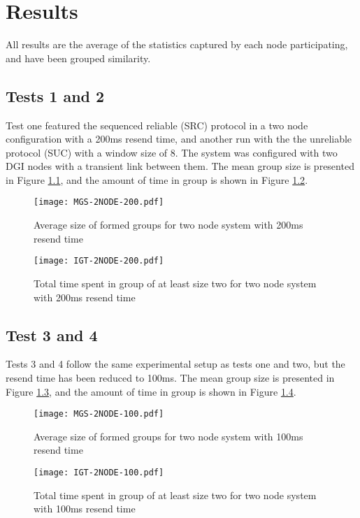 \chapter{Results}

All results are the average of the statistics captured by each node participating, and have been grouped similarity.

\section{Tests 1 and 2}
Test one featured the sequenced reliable (SRC) protocol in a two node configuration with a 200ms resend time, and another run with the
the unreliable protocol (SUC) with a window size of 8. The system was configured with two DGI nodes with a transient link between them.
The mean group size is presented in Figure \ref{fig:MGS-2NODE-200}, and the amount of time in group is shown in Figure \ref{fig:IGT-2NODE-200}.

\begin{figure}[!h]
\centering
\texttt{[image: MGS-2NODE-200.pdf]}
\caption{Average size of formed groups for two node system with 200ms resend time}
\label{fig:MGS-2NODE-200}
\end{figure}

\begin{figure}[!h]
\centering
\texttt{[image: IGT-2NODE-200.pdf]}
\caption{Total time spent in group of at least size two for two node system with 200ms resend time}
\label{fig:IGT-2NODE-200}
\end{figure}

\section{Test 3 and 4}

Tests 3 and 4 follow the same experimental setup as tests one and two, but the resend time has been reduced to 100ms.
The mean group size is presented in Figure \ref{fig:MGS-2NODE-100}, and the amount of time in group is shown in Figure \ref{fig:IGT-2NODE-100}.

\begin{figure}[!h]
\centering
\texttt{[image: MGS-2NODE-100.pdf]}
\caption{Average size of formed groups for two node system with 100ms resend time}
\label{fig:MGS-2NODE-100}
\end{figure}

\begin{figure}[!h]
\centering
\texttt{[image: IGT-2NODE-100.pdf]}
\caption{Total time spent in group of at least size two for two node system with 100ms resend time}
\label{fig:IGT-2NODE-100}
\end{figure}

